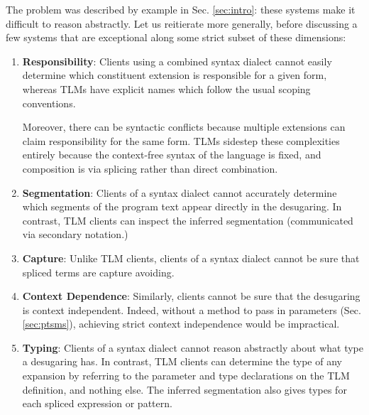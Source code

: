 \documentclass[acmsmall,review,anonymous]{acmart}\settopmatter{printfolios=true,printccs=false,printacmref=false}
\begin{document}
The problem was described by example in Sec. \ref{sec:intro}: these systems make it difficult to reason abstractly. Let us reitierate more generally, before discussing a few systems that are exceptional along some strict subset of these dimensions:
\begin{enumerate}[noitemsep,nolistsep,leftmargin=10pt]
\item \textbf{Responsibility}: Clients using a combined syntax dialect cannot easily determine which constituent extension is responsible for a given form, whereas TLMs have explicit names which follow the usual scoping conventions. 

Moreover, there can be syntactic conflicts because multiple extensions can claim responsibility for the same form. TLMs sidestep these complexities entirely because the context-free syntax of the language is fixed, and composition is via splicing rather than direct combination.
\item \textbf{Segmentation}: Clients of a syntax dialect cannot accurately determine which segments of the program text appear directly in the desugaring. In contrast, TLM clients can inspect the inferred segmentation (communicated via secondary notation.)
\item \textbf{Capture}: Unlike TLM clients, clients of a syntax dialect cannot be sure that spliced terms are capture avoiding. 
\item \textbf{Context Dependence}: Similarly, clients cannot be sure that the desugaring is context independent. Indeed, without a method to pass in parameters (Sec. \ref{sec:ptsms}), achieving strict context independence would be impractical.
\item \textbf{Typing}: Clients of a syntax dialect cannot reason abstractly about what type a desugaring has. In contrast, TLM clients can determine the type of any expansion by referring to the parameter and type declarations on the TLM definition, and nothing else. The inferred segmentation also gives types for each spliced expression or pattern. %
\end{enumerate}


\end{document}

